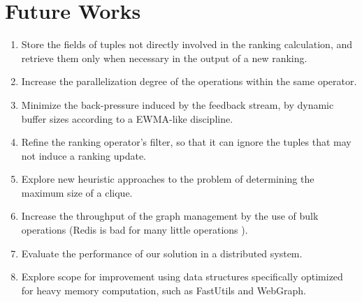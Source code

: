 \section{Future Works}
\label{sec:future-works}

\begin{enumerate}
	\item Store the fields of tuples not directly involved in the ranking calculation, and retrieve them only when necessary in the output of a new ranking.
	
	\item Increase the parallelization degree of the operations within the same operator.
	
	\item Minimize the back-pressure induced by the feedback stream, by dynamic buffer sizes according to a EWMA-like discipline.
	
	\item Refine the ranking operator's filter, so that it can ignore the tuples that may not induce a ranking update.
	
	\item Explore new heuristic approaches to the problem of determining the maximum size of a clique.
	
	\item Increase the throughput of the graph management by the use of bulk operations (Redis is bad for many little operations \cite{ZhangTudorChenOoi2014}).
	
	\item Evaluate the performance of our solution in a distributed system.
	
	\item Explore scope for improvement using data structures specifically optimized for heavy memory computation, such as FastUtils\cite{FastUtil} and WebGraph\cite{WebGraph}.
	
\end{enumerate}


